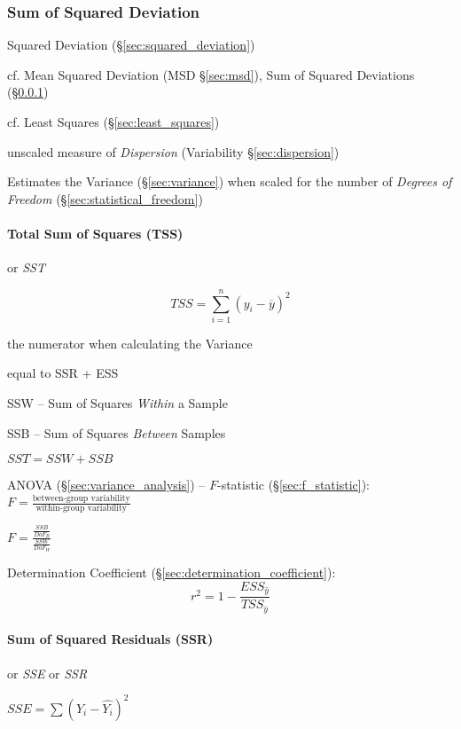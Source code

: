 \subsubsection{Sum of Squared Deviation}\label{sec:sum_squared_deviation}

\fist Squared Deviation (\S\ref{sec:squared_deviation})

cf. Mean Squared Deviation (MSD \S\ref{sec:msd}), Sum of Squared
Deviations (\S\ref{sec:sum_squared_deviation})

\fist cf. Least Squares (\S\ref{sec:least_squares})

unscaled measure of \emph{Dispersion} (Variability \S\ref{sec:dispersion})

Estimates the Variance (\S\ref{sec:variance}) when scaled for the number of
\emph{Degrees of Freedom} (\S\ref{sec:statistical_freedom})



\paragraph{Total Sum of Squares (TSS)}\label{sec:tss}\hfill

or \emph{SST}

\[
  TSS = \sum_{i=1}^n (y_i - \overline{y})^2
\]

the numerator when calculating the Variance

equal to SSR + ESS

SSW -- Sum of Squares \emph{Within} a Sample

SSB -- Sum of Squares \emph{Between} Samples

$SST = SSW + SSB$

ANOVA (\S\ref{sec:variance_analysis}) --
$F$-statistic (\S\ref{sec:f_statistic}):
$F = \frac{\text{between-group variability}}{\text{within-group variability}}$

$F = \frac{\frac{SSB}{DoF_B}}{\frac{SSW}{DoF_W}}$

Determination Coefficient (\S\ref{sec:determination_coefficient}):
\[
  r^2 = 1 - \frac{
    ESS_{\hat{y}}
  }{
    TSS_{\overline{y}}
  }
\]



\paragraph{Sum of Squared Residuals (SSR)}\label{sec:ssr}\hfill

or \emph{SSE} or \emph{SSR}

$SSE = \sum(Y_i - \hat{Y_i})^2$

